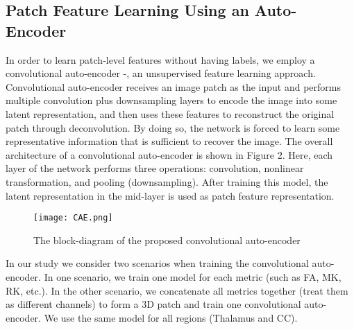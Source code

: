 \documentclass[letterpaper, 10 pt, conference]{ieeeconf}  %
\begin{document}
\subsection{Patch Feature Learning Using an Auto-Encoder}
In order to learn patch-level features without having labels, we employ a convolutional auto-encoder \cite{CAE}-\cite{cae2},  an unsupervised feature learning approach.
Convolutional auto-encoder receives an image patch as the input and performs multiple convolution plus downsampling layers to encode the image into some latent representation, and then uses these features to reconstruct the original patch  through deconvolution.
By doing so,  the network is forced to learn some representative information that is sufficient to recover the image.
The overall architecture of a convolutional auto-encoder is shown in Figure 2.
Here, each layer of the network performs three operations: convolution, nonlinear transformation, and pooling (downsampling).
After training this model, the latent representation in the mid-layer is used as patch feature representation.
\begin{figure}[h]
\begin{center}
    \texttt{[image: CAE.png]}
\end{center}
  \caption{The block-diagram of the proposed convolutional auto-encoder}
\end{figure}



In our study we consider two scenarios when training the convolutional auto-encoder.
In one scenario, we train one model for each metric (such as FA, MK, RK, etc.).
In the other scenario, we concatenate all metrics together (treat them as different channels) to form a 3D patch and train one convolutional auto-encoder.
We use the same model for all regions (Thalamus and CC).

 
\end{document}
